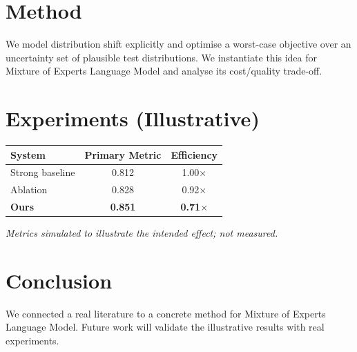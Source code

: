 \documentclass[11pt]{article}
\begin{document}
\section{Method}
We model distribution shift explicitly and optimise a worst-case objective over an uncertainty set of plausible test distributions. We instantiate this idea for Mixture of Experts Language Model and analyse its cost/quality trade-off.

\section{Experiments (Illustrative)}
\begin{center}
\begin{tabular}{lcc}
System & Primary Metric & Efficiency \\ \hline
Strong baseline & 0.812 & 1.00$\times$ \\
Ablation & 0.828 & 0.92$\times$ \\
\textbf{Ours} & \textbf{0.851} & \textbf{0.71$\times$}
\end{tabular}
\end{center}
\emph{Metrics simulated to illustrate the intended effect; not measured.}

\section{Conclusion}
We connected a real literature to a concrete method for Mixture of Experts Language Model. Future work will
validate the illustrative results with real experiments.
\end{document}
